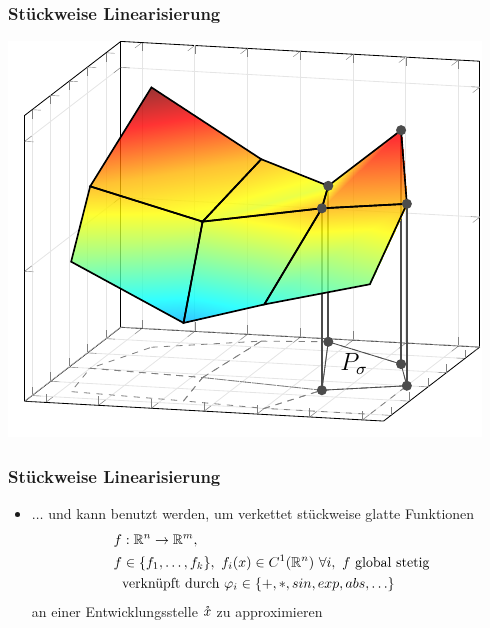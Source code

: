 \begin{frame}[<+->]
\frametitle{Stückweise Linearisierung}
\centering
\includegraphics[width=0.65\linewidth]{../dipl_tex/img/tikz/polyhedral_subdevision.pdf}
\end{frame}

\begin{frame}[<+->]
\frametitle{Stückweise Linearisierung}
\begin{itemize}
 \item $\ldots$ und kann benutzt werden, um verkettet stückweise glatte Funktionen 
 \[
 \begin{aligned}
   f&:\mathbb R^n \to \mathbb R^m, \\
 f&\in \lbrace f_1,\ldots,f_k\rbrace,~f_i(x) \in C^1(\mathbb R^n)~\forall i,~f \text{ global stetig}\\
 &\text{verknüpft durch }\varphi_i \in \lbrace +,*,sin,exp,abs ,\ldots\rbrace                                                                
 \end{aligned}
 \]
an einer Entwicklungsstelle $\mathring{x}$ zu approximieren
\end{itemize}
\end{frame}

